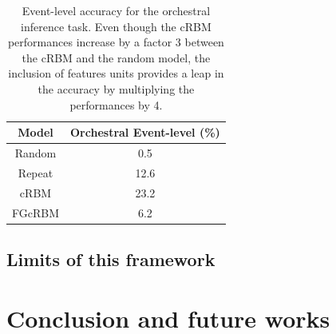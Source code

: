 \documentclass[twoside,twocolumn]{article}
\begin{document}
\begin{table}[h]
\centering
\begin{tabular}{c c}
\hline
Model & Orchestral Event-level (\%)\\
\hline
Random & 0.5\\ 
Repeat & 12.6\\
\hline \hline
cRBM & 23.2\\ 
FGcRBM & 6.2\\ 
\end{tabular}
\caption{Event-level accuracy for the orchestral inference task. Even though the cRBM performances increase by a factor 3 between the cRBM and the random model, the inclusion of features units provides a leap in the accuracy by multiplying the performances by 4.}
\label{tab:result_event_level}
\end{table}

\subsection{Limits of this framework}

\section{Conclusion and future works}




\end{document}
